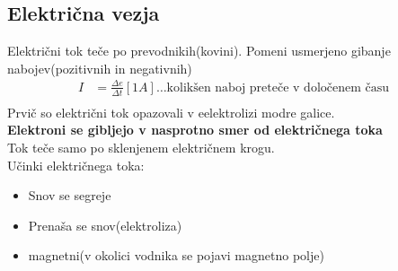 {\color{indiagreen}\subsection{Električna vezja}}
Električni tok teče po prevodnikih(kovini). Pomeni usmerjeno gibanje nabojev(pozitivnih in negativnih)\\
\begin{align*}
	I &= \frac{\Delta e}{\Delta t}[1A] \dots \text{kolikšen naboj preteče v določenem času}\\
\end{align*}
Prvič so električni tok opazovali v eelektrolizi modre galice.\\
\textbf{Elektroni se gibljejo v nasprotno smer od električnega toka}\\
Tok teče samo po sklenjenem električnem krogu.\\
Učinki električnega toka:
\begin{itemize}
	\item Snov se segreje
	\item Prenaša se snov(elektroliza)
	\item magnetni(v okolici vodnika se pojavi magnetno polje)
\end{itemize}